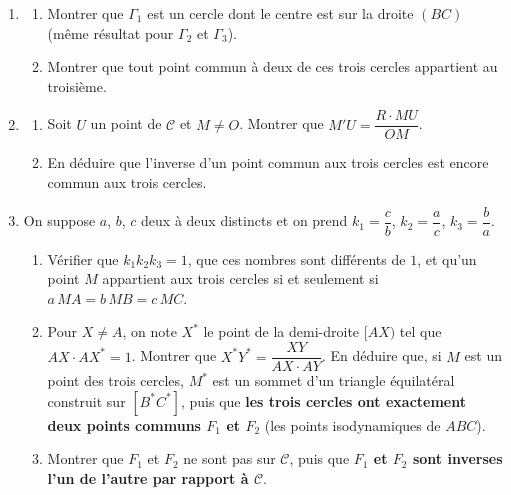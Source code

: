 \begin{enumerate}
  \item
  \begin{enumerate}
    \item Montrer que $\Gamma_1$ est un cercle dont le centre est sur la droite $(BC)$ (même résultat pour $\Gamma_2$ et $\Gamma_3$).
    \item Montrer que tout point commun à deux de ces trois cercles appartient au troisième.
  \end{enumerate}
  \item
  \begin{enumerate}
    \item Soit $U$ un point de $\mathcal C$ et $M\neq O$. Montrer que $M'U=\dfrac{R\cdot MU}{OM}$.
    \item En déduire que l'inverse d'un point commun aux trois cercles est encore commun aux trois cercles.
  \end{enumerate}
  \item On suppose $a$, $b$, $c$ deux à deux distincts et on prend $k_1=\dfrac cb$, $k_2=\dfrac ac$, $k_3=\dfrac ba$.
  \begin{enumerate}
    \item Vérifier que $k_1k_2k_3=1$, que ces nombres sont différents de $1$, et qu'un point $M$ appartient aux trois cercles si et seulement si $a\,MA=b\,MB=c\,MC$.
    \item Pour $X\neq A$, on note $X^*$ le point de la demi-droite $[AX)$ tel que $AX\cdot AX^*=1$. Montrer que $X^*Y^*=\dfrac{XY}{AX\cdot AY}$. En déduire que, si $M$ est un point des trois cercles, $M^*$ est un sommet d'un triangle équilatéral construit sur $[B^*C^*]$, puis que \textbf{les trois cercles ont exactement deux points communs $F_1$ et $F_2$} (les points isodynamiques de $ABC$).
    \item Montrer que $F_1$ et $F_2$ ne sont pas sur $\mathcal C$, puis que \textbf{$F_1$ et $F_2$ sont inverses l'un de l'autre par rapport à $\mathcal C$}.
  \end{enumerate}
\end{enumerate}

